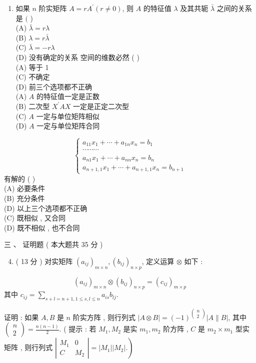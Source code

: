 \documentclass[10pt]{article}
\begin{document}
{\begin{enumerate}
  \item  如果  $n$  阶实矩阵  $A=r A^{\prime}(r \neq 0)$,  则  $A$  的特征值  $\lambda$  及其共轭  $\bar{\lambda}$  之间的关系是  $($ )\\
(A) $\bar{\lambda}=r \lambda$\\
(B) $\lambda=r \bar{\lambda}$\\
(C) $\bar{\lambda}=-r \lambda$\\
(D)  没有确定的关系   空间的维数必然  ( )\\
(A)  等于  1\\
(C)  不确定 \\
(D)  前三个选项都不正确 \\
(A) $A$  的特征值一定是正数 \\
(B)  二次型  $X^{\prime} A X$  一定是正定二次型 \\
(C) $A$  一定与单位矩阵相似 \\
(D) $A$  一定与单位矩阵合同 

\end{enumerate}
$$
\left\{\begin{array}{l}
a_{11} x_{1}+\cdots+a_{1 n} x_{n}=b_{1} \\
\cdots \cdots \cdots \\
a_{n 1} x_{1}+\cdots+a_{n n} x_{n}=b_{n} \\
a_{n+1,1} x_{1}+\cdots+a_{n+1,1} x_{n}=b_{n+1}
\end{array}\right.
$$
 有解的 ( )\\
(A)  必要条件 \\
(B)  充分条件 \\
(D)  以上三个选项都不正确 \\
(C)  既相似 ,  又合同 \\
(D)  既不相似 ,  也不合同 

 三 、 证明题 ( 本大题共  35  分 )

\begin{enumerate}
  \setcounter{enumi}{3}
  \item ( 13  分 )  对实矩阵  $\left(a_{i j}\right)_{m \times n},\left(b_{i j}\right)_{n \times p}$,  定义运算  $\otimes$  如下 :
\end{enumerate}
$$
\left(a_{i j}\right)_{m \times n} \otimes\left(b_{i j}\right)_{n \times p}=\left(c_{i j}\right)_{m \times p}
$$
 其中  $c_{i j}=\sum_{s+l=n+1,1 \leq s, l \leq n} a_{i s} b_{l j}$.

 证明 :  如果  $A, B$  是  $n$  阶实方阵 ,  则行列式  $|A \otimes B|=(-1)^{\left(\begin{array}{c}n \\ 2\end{array}\right)}|A \| B|$,  其中  $\left(\begin{array}{c}n \\ 2\end{array}\right)=\frac{n(n-1)}{2}$. ( 提示 :  若  $M_{1}, M_{2}$  是实  $m_{1}, m_{2}$  阶方阵 , $C$  是  $m_{2} \times m_{1}$  型实矩阵 ,  则行列式  $\left.\left|\begin{array}{cc}M_{1} & 0 \\ C & M_{2}\end{array}\right|=\left|M_{1}\right|\left|M_{2}\right| .\right)$

}
\end{document}
